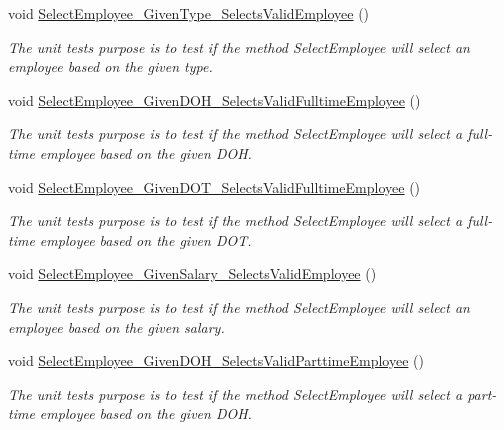 \begin{DoxyCompactItemize}
void \hyperlink{class_the_company_1_1_tests_1_1_select_employee_tests_a83e1e05af3c20bb0fda16478b24639b0}{Select\+Employee\+\_\+\+Given\+Type\+\_\+\+Selects\+Valid\+Employee} ()
\begin{DoxyCompactList}\small\item\em The unit test\textquotesingle{}s purpose is to test if the method Select\+Employee will select an employee based on the given type. \end{DoxyCompactList}\item 
void \hyperlink{class_the_company_1_1_tests_1_1_select_employee_tests_af066cf2d16ff4e78137853c699b0cb98}{Select\+Employee\+\_\+\+Given\+D\+O\+H\+\_\+\+Selects\+Valid\+Fulltime\+Employee} ()
\begin{DoxyCompactList}\small\item\em The unit test\textquotesingle{}s purpose is to test if the method Select\+Employee will select a full-\/time employee based on the given D\+O\+H. \end{DoxyCompactList}\item 
void \hyperlink{class_the_company_1_1_tests_1_1_select_employee_tests_a698fcb117bbed18e696922f7aa0be670}{Select\+Employee\+\_\+\+Given\+D\+O\+T\+\_\+\+Selects\+Valid\+Fulltime\+Employee} ()
\begin{DoxyCompactList}\small\item\em The unit test\textquotesingle{}s purpose is to test if the method Select\+Employee will select a full-\/time employee based on the given D\+O\+T. \end{DoxyCompactList}\item 
void \hyperlink{class_the_company_1_1_tests_1_1_select_employee_tests_a39ac4fcbb3e3b3f051bfa9b648df71db}{Select\+Employee\+\_\+\+Given\+Salary\+\_\+\+Selects\+Valid\+Employee} ()
\begin{DoxyCompactList}\small\item\em The unit test\textquotesingle{}s purpose is to test if the method Select\+Employee will select an employee based on the given salary. \end{DoxyCompactList}\item 
void \hyperlink{class_the_company_1_1_tests_1_1_select_employee_tests_a5f4abc7c93c20f1e73cd5c9a673745b4}{Select\+Employee\+\_\+\+Given\+D\+O\+H\+\_\+\+Selects\+Valid\+Parttime\+Employee} ()
\begin{DoxyCompactList}\small\item\em The unit test\textquotesingle{}s purpose is to test if the method Select\+Employee will select a part-\/time employee based on the given D\+O\+H. \end{DoxyCompactList}\item 

\end{DoxyCompactItemize}
